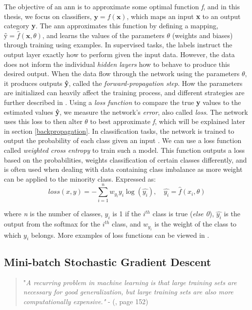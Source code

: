     The objective of an \gls{ann} is to approximate some optimal function \textit{f}, and in this thesis, we focus on classifiers, $\textbf{y} = f(\textbf{x})$, which maps an input \textbf{x} to an output category \textbf{y}. The \gls{ann} approximates this function by defining a mapping, $\textbf{\^{y}} = \hat{f}(\textbf{x},\theta)$, and learns the values of the parameters \textit{$\theta$} (weights and biases) through training using examples. In supervised tasks, the labels instruct the output layer exactly how to perform given the input data. However, the data does not inform the individual \textit{hidden layers} how to behave to produce this desired output. When the data flow through the network using the parameters $\theta$, it produces outputs \textbf{\^{y}}, called the \textit{forward-propagation step}. How the parameters are initialized can heavily affect the training process, and different strategies are further described in \citet{Goodfellow-et-al-2016}. Using a \textit{loss function} to compare the true \textbf{y} values to the estimated values \textbf{\^{y}}, we measure the network's \textit{error}, also called \textit{loss}. The network uses this loss to then alter $\theta$ to best approximate \textit{f}, which will be explained later in section \ref{backpropagation}. In classification tasks, the network is trained to output the probability of each class given an input \cite{ho2019real_weighted_cross_entropy}. We can use a loss function called \textit{weighted cross entropy} to train such a model. This function outputs a loss based on the probabilities, weights classification of certain classes differently, and is often used when dealing with data containing class imbalance as more weight can be applied to the minority class. Expressed as:
        \begin{equation} \label{cross_entropy}
            loss(x,y) = - \sum^{n}_{i=1} w_{y_{i}}y_{i}\log(\hat{y_{i}}), \quad \hat{y_{i}} = \hat{f}(x_i,\theta)
        \end{equation}
    
    where \textit{n} is the number of classes, $y_{i}$ is 1 if the $i^{th}$ class is true (\textit{else 0}), $\hat{y_{i}}$ is the output from the softmax for the $i^{th}$ class, and $w_{y_{i}}$ is the weight of the class to which $y_{i}$ belongs. More examples of loss functions can be viewed in \citeauthor{mishra2017deep} \cite{mishra2017deep}.
    


\subsection{Mini-batch Stochastic Gradient Descent} \label{batch learning}
        \begin{quote}
        "\textit{A recurring problem in machine learning is that large training sets are necessary for good generalization, but large training sets are also more computationally
        expensive."} - (\citeauthor{Goodfellow-et-al-2016}\citeyear{Goodfellow-et-al-2016}, page 152)
    \end{quote}
    
